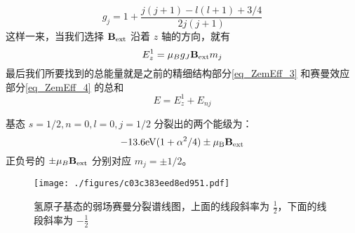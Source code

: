 \begin{equation}\label{eq_ZemEff_15}
g_j=1+\frac{j(j+1)-l(l+1)+3/4}{2j(j+1)}
\end{equation}
这样一来，当我们选择 $\mathbf{B}_{\rm{ext}}$ 沿着 $z$ 轴的方向，就有
\begin{equation}\label{eq_ZemEff_4}
E^1_z =\mu_Bg_J\mathbf{B}_{\rm{ext}}m_j
\end{equation}
最后我们所要找到的总能量就是之前的精细结构部分\autoref{eq_ZemEff_3} 和赛曼效应部分\autoref{eq_ZemEff_4} 的总和
\begin{equation}\label{eq_ZemEff_14}
E=E_z^1+E_{nj}
\end{equation}
\begin{example}{}
基态 $s=1/2,n=0,l=0,j=1/2$ 分裂出的两个能级为：
\begin{equation}\label{eq_ZemEff_16}
-13.6\rm{eV}(1+\alpha^2/4)\pm\mu_B\mathbf{B}_{\rm{ext}}\notag
\end{equation}
正负号的 $\pm\mu_B\mathbf{B}_{\rm{ext}}$ 分别对应 $m_j=\pm1/2$。\begin{figure}[ht]
\centering
\texttt{[image: ./figures/c03c383eed8ed951.pdf]}
\caption{氢原子基态的弱场赛曼分裂谱线图，上面的线段斜率为 $\frac{1}{2}$，下面的线段斜率为 $-\frac{1}{2}$} \label{fig_ZemEff_2}
\end{figure}
\end{example}
